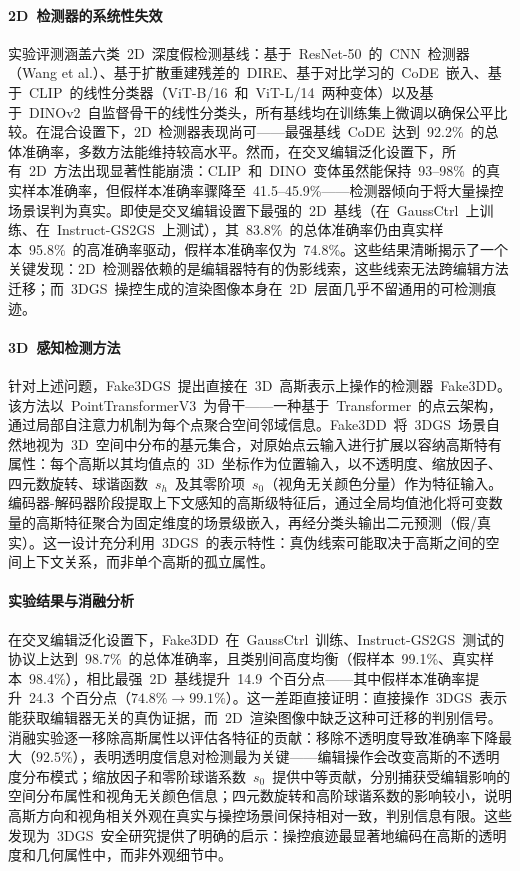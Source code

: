 \paragraph{2D~检测器的系统性失效} 实验评测涵盖六类~2D~深度假检测基线：基于~ResNet-50~的~CNN~检测器（Wang et al.）、基于扩散重建残差的~DIRE、基于对比学习的~CoDE~嵌入、基于~CLIP~的线性分类器（ViT-B/16~和~ViT-L/14~两种变体）以及基于~DINOv2~自监督骨干的线性分类头，所有基线均在训练集上微调以确保公平比较。在混合设置下，2D~检测器表现尚可——最强基线~CoDE~达到~92.2\%~的总体准确率，多数方法能维持较高水平。然而，在交叉编辑泛化设置下，所有~2D~方法出现显著性能崩溃：CLIP~和~DINO~变体虽然能保持~93--98\%~的真实样本准确率，但假样本准确率骤降至~41.5--45.9\%——检测器倾向于将大量操控场景误判为真实。即使是交叉编辑设置下最强的~2D~基线（在~GaussCtrl~上训练、在~Instruct-GS2GS~上测试），其~83.8\%~的总体准确率仍由真实样本~95.8\%~的高准确率驱动，假样本准确率仅为~74.8\%。这些结果清晰揭示了一个关键发现：2D~检测器依赖的是编辑器特有的伪影线索，这些线索无法跨编辑方法迁移；而~3DGS~操控生成的渲染图像本身在~2D~层面几乎不留通用的可检测痕迹。

\paragraph{3D~感知检测方法} 针对上述问题，Fake3DGS~提出直接在~3D~高斯表示上操作的检测器~Fake3DD。该方法以~PointTransformerV3~为骨干——一种基于~Transformer~的点云架构，通过局部自注意力机制为每个点聚合空间邻域信息。Fake3DD~将~3DGS~场景自然地视为~3D~空间中分布的基元集合，对原始点云输入进行扩展以容纳高斯特有属性：每个高斯以其均值点的~3D~坐标作为位置输入，以不透明度、缩放因子、四元数旋转、球谐函数~$s_h$~及其零阶项~$s_0$（视角无关颜色分量）作为特征输入。编码器-解码器阶段提取上下文感知的高斯级特征后，通过全局均值池化将可变数量的高斯特征聚合为固定维度的场景级嵌入，再经分类头输出二元预测（假/真实）。这一设计充分利用~3DGS~的表示特性：真伪线索可能取决于高斯之间的空间上下文关系，而非单个高斯的孤立属性。

\paragraph{实验结果与消融分析} 在交叉编辑泛化设置下，Fake3DD~在~GaussCtrl~训练、Instruct-GS2GS~测试的协议上达到~98.7\%~的总体准确率，且类别间高度均衡（假样本~99.1\%、真实样本~98.4\%），相比最强~2D~基线提升~14.9~个百分点——其中假样本准确率提升~24.3~个百分点（$74.8\% \to 99.1\%$）。这一差距直接证明：直接操作~3DGS~表示能获取编辑器无关的真伪证据，而~2D~渲染图像中缺乏这种可迁移的判别信号。消融实验逐一移除高斯属性以评估各特征的贡献：移除不透明度导致准确率下降最大（$92.5\%$），表明透明度信息对检测最为关键——编辑操作会改变高斯的不透明度分布模式；缩放因子和零阶球谐系数~$s_0$~提供中等贡献，分别捕获受编辑影响的空间分布属性和视角无关颜色信息；四元数旋转和高阶球谐系数的影响较小，说明高斯方向和视角相关外观在真实与操控场景间保持相对一致，判别信息有限。这些发现为~3DGS~安全研究提供了明确的启示：操控痕迹最显著地编码在高斯的透明度和几何属性中，而非外观细节中。

